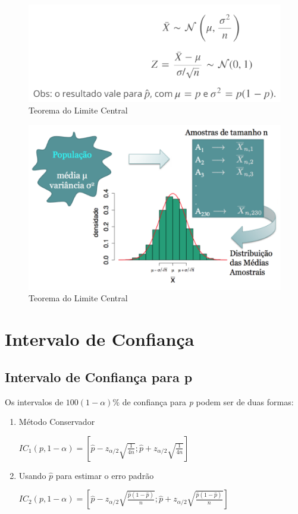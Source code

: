 \documentclass[a4paper, 12pt]{article}
\begin{document}
	\begin{figure}[h]
		\centering
		\includegraphics[width=0.7\linewidth]{imagens/teo1}
		\caption{Teorema do Limite Central}
		\label{fig:teo1}
	\end{figure}
	\newpage
	\begin{figure}[h]
		\centering
		\includegraphics[width=0.7\linewidth]{imagens/teo}
		\caption{Teorema do Limite Central}
		\label{fig:teo}
	\end{figure}
	
\section{Intervalo de Confiança}	
\subsection{Intervalo de Confiança para p}
	Os intervalos de $100(1- \alpha)\%$ de confiança para \textit{p} podem ser de duas formas:
	
	\begin{enumerate}
		\item Método Conservador
			\begin{center}
				\Large
				$
				IC_1(p, 1-\alpha) = [\hat{p} - z_{\alpha /2}\sqrt{\frac{1}{4n}};\hat{p} + z_{\alpha /2}\sqrt{\frac{1}{4n}}] 
				$
			\end{center}
		\item Usando $\hat{p}$ para estimar o erro padrão
			\begin{center}
				\Large
				$
				IC_2(p, 1-\alpha) = [\hat{p} - z_{\alpha /2}\sqrt{\frac{\hat{p}(1-\hat{p})}{n}};\hat{p} + z_{\alpha /2}\sqrt{\frac{\hat{p}(1-\hat{p})}{n}}] 
				$
			\end{center}
	\end{enumerate}
\end{document}

